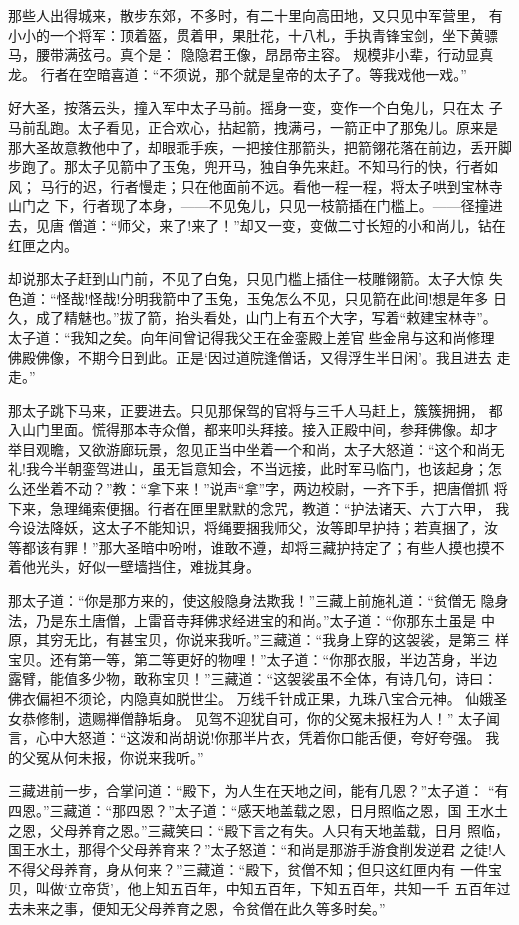 那些人出得城来，散步东郊，不多时，有二十里向高田地，又只见中军营里，
有小小的一个将军：顶着盔，贯着甲，果肚花，十八札，手执青锋宝剑，坐下黄骠
马，腰带满弦弓。真个是：
隐隐君王像，昂昂帝主容。
规模非小辈，行动显真龙。
行者在空暗喜道：“不须说，那个就是皇帝的太子了。等我戏他一戏。”

好大圣，按落云头，撞入军中太子马前。摇身一变，变作一个白兔儿，只在太
子马前乱跑。太子看见，正合欢心，拈起箭，拽满弓，一箭正中了那兔儿。原来是
那大圣故意教他中了，却眼乖手疾，一把接住那箭头，把箭翎花落在前边，丢开脚
步跑了。那太子见箭中了玉兔，兜开马，独自争先来赶。不知马行的快，行者如风；
马行的迟，行者慢走；只在他面前不远。看他一程一程，将太子哄到宝林寺山门之
下，行者现了本身，——不见兔儿，只见一枝箭插在门槛上。——径撞进去，见唐
僧道：“师父，来了!来了！”却又一变，变做二寸长短的小和尚儿，钻在红匣之内。

却说那太子赶到山门前，不见了白兔，只见门槛上插住一枝雕翎箭。太子大惊
失色道：“怪哉!怪哉!分明我箭中了玉兔，玉兔怎么不见，只见箭在此间!想是年多
日久，成了精魅也。”拔了箭，抬头看处，山门上有五个大字，写着“敕建宝林寺”。
太子道：“我知之矣。向年间曾记得我父王在金銮殿上差官些金帛与这和尚修理
佛殿佛像，不期今日到此。正是‘因过道院逢僧话，又得浮生半日闲’。我且进去
走走。”

那太子跳下马来，正要进去。只见那保驾的官将与三千人马赶上，簇簇拥拥，
都入山门里面。慌得那本寺众僧，都来叩头拜接。接入正殿中间，参拜佛像。却才
举目观瞻，又欲游廊玩景，忽见正当中坐着一个和尚，太子大怒道：“这个和尚无
礼!我今半朝銮驾进山，虽无旨意知会，不当远接，此时军马临门，也该起身；怎
么还坐着不动？”教：“拿下来！”说声“拿”字，两边校尉，一齐下手，把唐僧抓
将下来，急理绳索便捆。行者在匣里默默的念咒，教道：“护法诸天、六丁六甲，
我今设法降妖，这太子不能知识，将绳要捆我师父，汝等即早护持；若真捆了，汝
等都该有罪！”那大圣暗中吩咐，谁敢不遵，却将三藏护持定了；有些人摸也摸不
着他光头，好似一壁墙挡住，难拢其身。

那太子道：“你是那方来的，使这般隐身法欺我！”三藏上前施礼道：“贫僧无
隐身法，乃是东土唐僧，上雷音寺拜佛求经进宝的和尚。”太子道：“你那东土虽是
中原，其穷无比，有甚宝贝，你说来我听。”三藏道：“我身上穿的这袈裟，是第三
样宝贝。还有第一等，第二等更好的物哩！”太子道：“你那衣服，半边苫身，半边
露臂，能值多少物，敢称宝贝！”三藏道：“这袈裟虽不全体，有诗几句，诗曰：
佛衣偏袒不须论，内隐真如脱世尘。
万线千针成正果，九珠八宝合元神。
仙娥圣女恭修制，遗赐禅僧静垢身。
见驾不迎犹自可，你的父冤未报枉为人！”
太子闻言，心中大怒道：“这泼和尚胡说!你那半片衣，凭着你口能舌便，夸好夸强。
我的父冤从何未报，你说来我听。”

三藏进前一步，合掌问道：“殿下，为人生在天地之间，能有几恩？”太子道：
“有四恩。”三藏道：“那四恩？”太子道：“感天地盖载之恩，日月照临之恩，国
王水土之恩，父母养育之恩。”三藏笑曰：“殿下言之有失。人只有天地盖载，日月
照临，国王水土，那得个父母养育来？”太子怒道：“和尚是那游手游食削发逆君
之徒!人不得父母养育，身从何来？”三藏道：“殿下，贫僧不知；但只这红匣内有
一件宝贝，叫做‘立帝货’，他上知五百年，中知五百年，下知五百年，共知一千
五百年过去未来之事，便知无父母养育之恩，令贫僧在此久等多时矣。”

